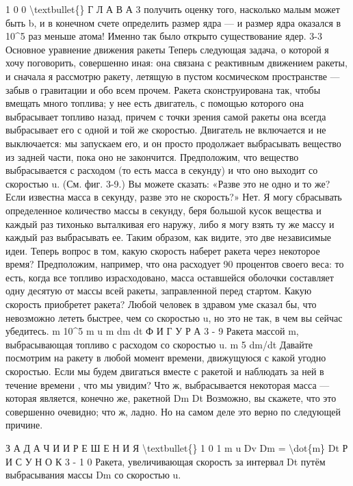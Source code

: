 \documentclass[10pt,oneside]{article}
\begin{document}
1 0 0 \textbackslash{}textbullet\{\} Г Л А В А  3 получить оценку того, насколько малым может быть b, и в конечном счете определить размер ядра --- и размер ядра оказался в 10\textasciicircum{}5 раз меньше атома! Именно так было открыто существование ядер. 3-3 Основное уравнение движения ракеты Теперь следующая задача, о которой я хочу поговорить, совершенно иная: она связана с реактивным движением ракеты, и сначала я рассмотрю ракету, летящую в пустом космическом пространстве --- забыв о гравитации и обо всем прочем. Ракета сконструирована так, чтобы вмещать много топлива; у нее есть двигатель, с помощью которого она выбрасывает топливо назад, причем с точки зрения самой ракеты она всегда выбрасывает его с одной и той же скоростью. Двигатель не включается и не выключается: мы запускаем его, и он просто продолжает выбрасывать вещество из задней части, пока оно не закончится. Предположим, что вещество выбрасывается с расходом (то есть масса в секунду) и что оно выходит со скоростью u. (См. фиг. 3-9.) Вы можете сказать: «Разве это не одно и то же? Если известна масса в секунду, разве это не скорость?» Нет. Я могу сбрасывать определенное количество массы в секунду, беря большой кусок вещества и каждый раз тихонько выталкивая его наружу, либо я могу взять ту же массу и каждый раз выбрасывать ее. Таким образом, как видите, это две независимые идеи. Теперь вопрос в том, какую скорость наберет ракета через некоторое время? Предположим, например, что она расходует 90 процентов своего веса: то есть, когда все топливо израсходовано, масса оставшейся оболочки составляет одну десятую от массы всей ракеты, заправленной перед стартом. Какую скорость приобретет ракета? Любой человек в здравом уме сказал бы, что невозможно лететь быстрее, чем со скоростью u, но это не так, в чем вы сейчас убедитесь. m 10\textasciicircum{}5 m u m  dm dt Ф И Г У Р А 3 - 9 Ракета массой m, выбрасывающая топливо с расходом со скоростью u. m 5 dm/dt Давайте посмотрим на ракету в любой момент времени, движущуюся с какой угодно скоростью. Если мы будем двигаться вместе с ракетой и наблюдать за ней в течение времени , что мы увидим? Что ж, выбрасывается некоторая масса --- которая является, конечно же, ракетной Dm Dt Возможно, вы скажете, что это совершенно очевидно; что ж, ладно. Но на самом деле это верно по следующей причине.\par

З А Д А Ч И  И  Р Е Ш Е Н И Я \textbackslash{}textbullet\{\} 1 0 1 m u Dv Dm = \textbackslash{}dot\{m\} Dt Р И С У Н О К  3 - 1 0 Ракета, увеличивающая скорость за интервал Dt путём выбрасывания массы Dm со скоростью u.\par
\end{document}
